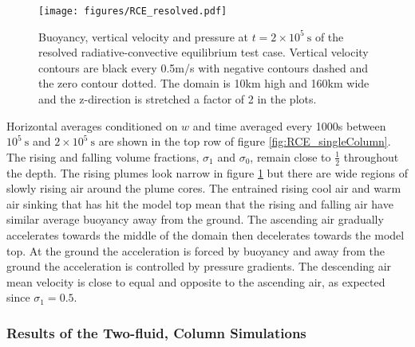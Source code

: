 \documentclass[draft]{agujournal2019}
\begin{document}
\begin{figure}
\noindent 
\texttt{[image: figures/RCE\_resolved.pdf]}
\caption{\label{fig:RCE_resolved}
Buoyancy, vertical velocity and pressure at $t=2\times10^{5}\ \text{s}$
of the resolved radiative-convective equilibrium test case. Vertical
velocity contours are black every 0.5m/s with negative contours dashed
and the zero contour dotted. The domain is 10km high and 160km wide
and the z-direction is stretched a factor of 2 in the plots.}
\end{figure}

Horizontal averages conditioned on $w$ and time averaged every 1000s
between $10^{5}\ \text{s}$ and $2\times10^{5}\ \text{s}$ are shown
in the top row of figure \ref{fig:RCE_singleColumn}. The rising and
falling volume fractions, $\sigma_{1}$ and $\sigma_{0}$, remain
close to $\frac{1}{2}$ throughout the depth. The rising plumes look
narrow in figure \ref{fig:RCE_resolved} but there are wide regions
of slowly rising air around the plume cores. The entrained rising
cool air and warm air sinking that has hit the model top mean that
the rising and falling air have similar average buoyancy away from
the ground. The ascending air gradually accelerates towards the middle
of the domain then decelerates towards the model top. At the ground
the acceleration is forced by buoyancy and away from the ground the
acceleration is controlled by pressure gradients. The descending air
mean velocity is close to equal and opposite to the ascending air,
as expected since $\sigma_{1}=0.5$.

\subsubsection{Results of the Two-fluid,  Column Simulations}
\end{document}
